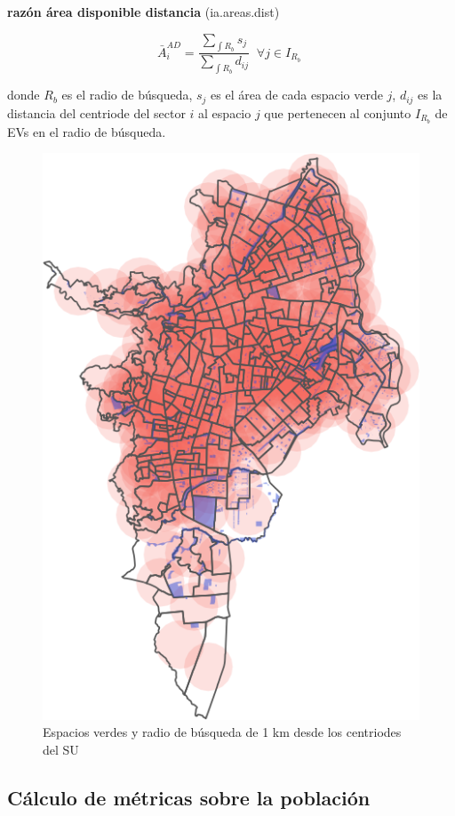 \documentclass[12pt,a4paper,oneside, openany]{book}
\theoremstyle{definition}
\theoremstyle{definition}
\theoremstyle{definition}
\theoremstyle{remark}
\begin{document}
\textbf{razón área disponible distancia} (ia.areas.dist)

\begin{equation}
\bar{A}^{AD}_i= \frac{\sum_{\int R_b }{s_j}}{\sum_{\int R_b }{d_{ij}}}  \;  \; \forall  j \in I_{R_b} \; 
\label{eq:areas-dists}
\end{equation}

donde \(R_b\) es el radio de búsqueda, \(s_j\) es el área de cada
espacio verde \(j\), \(d_{ij}\) es la distancia del centriode del sector
\(i\) al espacio \(j\) que pertenecen al conjunto \(I_{R_b}\) de EVs en
el radio de búsqueda.

\begin{figure}[H]

{\centering \includegraphics[width=0.7\linewidth]{tesis-unigis_files/figure-latex/mapa-rango1km-1} 

}

\caption{Espacios verdes y radio de búsqueda de 1 km desde los centriodes del SU}\label{fig:mapa-rango1km}
\end{figure}

\subsection{Cálculo de métricas sobre la
población}\label{cuxe1lculo-de-muxe9tricas-sobre-la-poblaciuxf3n}
\end{document}

